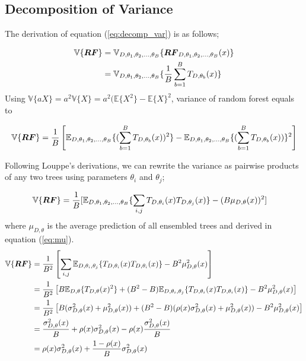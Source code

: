 \subsection{Decomposition of Variance}
\label{app:var_decomp}
The derivation of equation (\ref{eq:decomp_var}) is as follows;

\begin{align}
\mathbb{V}\{\boldsymbol{RF}\} & = \mathbb{V}_{D, \theta_{1}, \theta_{2},..., \theta_{B}}\{\boldsymbol{RF}_{D, \theta_{1},\theta_{2},..., \theta_{B}}(x) \}\notag \\
& = \mathbb{V}_{D, \theta_{1}, \theta_{2},..., \theta_{B}}\{\dfrac{1}{B}\sum_{b=1}^{B} T_{D,\theta_{b}}(x)\} \notag
\end{align}
Using $\mathbb{V}\{aX\} = a^2\mathbb{V}\{X\} = a^2 (\mathbb{E}\{X^2\} - \mathbb{E}\{X\}^2$, variance of random forest equals to

\begin{align}
\mathbb{V}\{\boldsymbol{RF}\} = \dfrac{1}{B}\left[\mathbb{E}_{D, \theta_{1}, \theta_{2},..., \theta_{B}}\{( \sum_{b=1}^{B} T_{D, \theta_{b}}(x))^2 \} - \mathbb{E}_{D, \theta_{1}, \theta_{2},..., \theta_{B}}\{( \sum_{b=1}^{B} T_{D, \theta_{b}}(x)) \}^2\right] \notag
\end{align}

Following Louppe's derivations, we can rewrite the variance as pairwise products of any two trees using parameters $\theta_{i}$ and $\theta_{j}$;

\begin{align}
\mathbb{V}\{\boldsymbol{RF}\} & = \dfrac{1}{B}[\mathbb{E}_{D, \theta_{1}, \theta_{2},..., \theta_{B}}\{\sum_{i,j} T_{D,\theta_{i}}(x) T_{D,\theta_{j}}(x)\} - (B \mu_{D,\theta}(x))^2] \notag
\end{align}
where $\mu_{D, \theta}$ is the average prediction of all ensembled trees and derived in equation (\ref{eq:mu}).
\begin{align}
\mathbb{V}\{\boldsymbol{RF}\} & = \dfrac{1}{B^2}\left[\sum_{i,j} \mathbb{E}_{D, \theta_{i}, \theta_{j}}\{T_{D,\theta_{i}}(x) T_{D,\theta_{i}}(x)\} - B^2 \mu_{D,\theta}^2(x)\right]\notag \\
& = \dfrac{1}{B^2}\left[B\mathbb{E}_{D,\theta}\{T_{D,\theta}(x)^2\} + (B^2 - B) \mathbb{E}_{D, \theta_{i}, \theta_{j}}\{T_{D,\theta_{i}}(x) T_{D,\theta_{i}}(x)\} - B^2 \mu_{D,\theta}^2(x)\right]\notag \\
& = \dfrac{1}{B^2}\left[B(\sigma_{D,\theta}^2(x) + \mu_{D,\theta}^2(x)) + (B^2 - B) (\rho(x)\sigma_{D,\theta}^2(x) + \mu_{D, \theta}^2(x)) - B^2 \mu_{D,\theta}^2(x)\right] \notag \\
& = \dfrac{\sigma_{D,\theta}^2(x)}{B} + \rho(x)\sigma_{D,\theta}^2(x) - \rho(x)\dfrac{\sigma_{D,\theta}^2(x)}{B}\notag \\
& = \rho(x)\sigma_{D,\theta}^2(x) + \dfrac{1 - \rho(x)}{B}\sigma_{D,\theta}^2(x) \notag
\end{align}